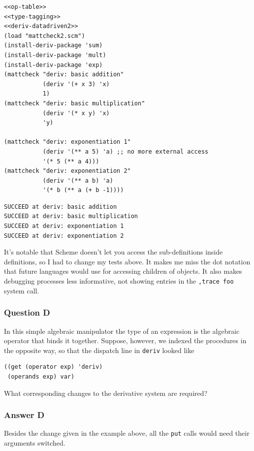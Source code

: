 \documentclass[final,fleqn,titlepage,twoside]{article}
\begin{document}
\begin{verbatim}
<<op-table>>
<<type-tagging>>
<<deriv-datadriven2>>
(load "mattcheck2.scm")
(install-deriv-package 'sum)
(install-deriv-package 'mult)
(install-deriv-package 'exp)
(mattcheck "deriv: basic addition"
           (deriv '(+ x 3) 'x)
           1)
(mattcheck "deriv: basic multiplication"
           (deriv '(* x y) 'x)
           'y)

(mattcheck "deriv: exponentiation 1"
           (deriv '(** a 5) 'a) ;; no more external access
           '(* 5 (** a 4)))
(mattcheck "deriv: exponentiation 2"
           (deriv '(** a b) 'a)
           '(* b (** a (+ b -1))))
\end{verbatim}

\begin{verbatim}
SUCCEED at deriv: basic addition
SUCCEED at deriv: basic multiplication
SUCCEED at deriv: exponentiation 1
SUCCEED at deriv: exponentiation 2
\end{verbatim}

It's notable that Scheme doesn't let you access the sub-definitions inside
definitions, so I had to change my tests above. It makes me miss the dot
notation that future languages would use for accessing children of objects. It
also makes debugging processes less informative, not showing entries in the
\texttt{,trace foo} system call.

\subsubsection{Question D}
\label{sec:org72015ae}
In this simple algebraic manipulator the type of an expression is the algebraic
operator that binds it together. Suppose, however, we indexed the procedures in
the opposite way, so that the dispatch line in \texttt{deriv} looked like

\begin{verbatim}
((get (operator exp) 'deriv)
 (operands exp) var)
\end{verbatim}

What corresponding changes to the derivative system are required?

\subsubsection{Answer D}
\label{sec:orga182225}
Besides the change given in the example above, all the \texttt{put} calls would need their arguments switched.
\end{document}
